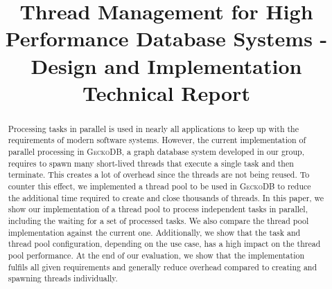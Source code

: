 \documentclass[conference]{IEEEtran}
\begin{document}



\title{Thread Management for High Performance Database Systems - Design and Implementation \\{\large Technical Report}\\}

\author{
	 \and
}

\maketitle


\begin{abstract}
        Processing tasks in parallel is used in nearly all applications to keep
        up with the requirements of modern software systems. However, the
        current implementation of parallel processing in \textsc{GeckoDB}, a graph database system developed in our group, requires
        to spawn many short-lived threads that execute a single task and then
        terminate. This creates a lot of overhead since the threads are not
        being reused. To counter this effect, we implemented a thread pool to be
        used in \textsc{GeckoDB} to reduce the additional time required
        to create and close thousands of threads. In this paper, we show our
        implementation of a thread pool to process independent tasks in parallel,
        including the waiting for a set of processed tasks. We also compare the
        thread pool implementation against the current one. Additionally, we show that the task and thread pool configuration,
        depending on the use case, has a high impact on the thread
        pool performance. At the end of our evaluation, we show that the implementation 
        fulfils all given requirements and generally reduce
        overhead compared to creating and spawning threads individually.
\end{abstract}
\end{document}
